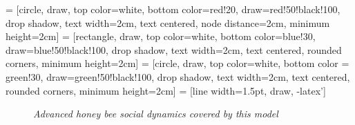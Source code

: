 
 = [circle, draw, top color=white, bottom color=red!20, draw=red!50!black!100, drop shadow, text width=2cm, text centered, node distance=2cm, minimum height=2cm]
 = [rectangle, draw, top color=white, bottom color=blue!30, draw=blue!50!black!100, drop shadow, text width=2cm, text centered, rounded corners, minimum height=2cm]
 = [circle, draw, top color=white, bottom color = green!30, draw=green!50!black!100, drop shadow, text width=2cm, text centered, rounded corners, minimum height=2cm]
 = [line width=1.5pt, draw, -latex']


\begin{figure}
	\centering
	\caption{\textit{Advanced honey bee social dynamics covered by this model}}
	\label{fig:modelOverview}
\end{figure}

